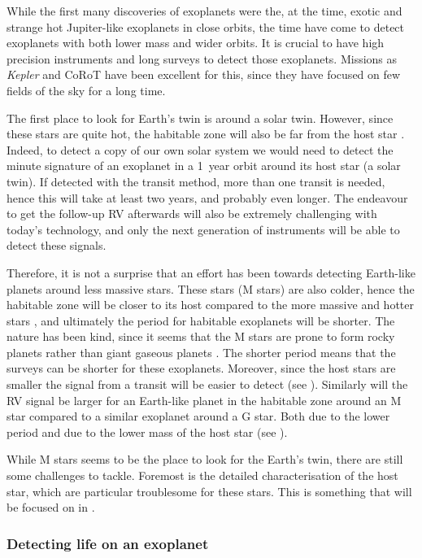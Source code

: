 While the first many discoveries of exoplanets were the, at the time, exotic and strange hot
Jupiter-like exoplanets in close orbits, the time have come to detect exoplanets with both lower
mass and wider orbits. It is crucial to have high precision instruments and long surveys to detect
those exoplanets. Missions as \emph{Kepler} and CoRoT have been excellent for this, since they have
focused on few fields of the sky for a long time.

The first place to look for Earth's twin is around a solar twin. However, since these stars are
quite hot, the habitable zone will also be far from the host star \citep[see e.g.]{Kasting1993}.
Indeed, to detect a copy of our own solar system we would need to detect the minute signature of an
exoplanet in a \SI{1}{year} orbit around its host star (a solar twin). If detected with the transit
method, more than one transit is needed, hence this will take at least two years, and probably even
longer. The endeavour to get the follow-up RV afterwards will also be extremely challenging with
today's technology, and only the next generation of instruments will be able to detect these
signals.

Therefore, it is not a surprise that an effort has been towards detecting Earth-like planets around
less massive stars. These stars (M stars) are also colder, hence the habitable zone will be closer
to its host compared to the more massive and hotter stars \citep{Kasting1997}, and ultimately the
period for habitable exoplanets will be shorter. The nature has been kind, since it seems that the M
stars are prone to form rocky planets rather than giant gaseous planets
\citep{Bonfils2013,Delfosse2013}. The shorter period means that the surveys can be shorter for these
exoplanets. Moreover, since the host stars are smaller the signal from a transit will be easier to
detect (see ). Similarly will the RV signal be larger for an Earth-like planet in
the habitable zone around an M star compared to a similar exoplanet around a G star. Both due to the
lower period and due to the lower mass of the host star (see ).

While M stars seems to be the place to look for the Earth's twin, there are still some challenges to
tackle. Foremost is the detailed characterisation of the host star, which are particular troublesome
for these stars. This is something that will be focused on in .

\subsubsection{Detecting life on an exoplanet}

